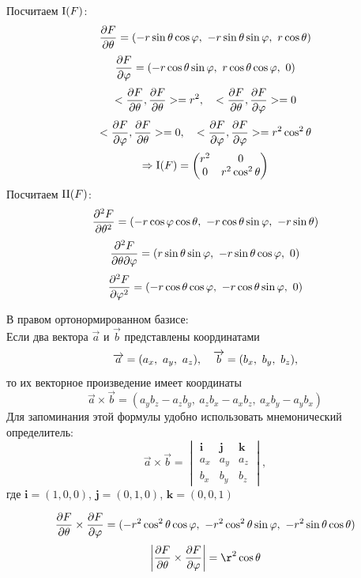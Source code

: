 \documentclass[main]{subfiles}
\begin{document}
    \begin{sol}
      Посчитаем $\RNumb{1}(F)$:
      \[\frac{\partial F}{\partial \theta} = (-r \sin\theta \cos\varphi,\ -r \sin\theta \sin\varphi,\ r \cos\theta)\]
      \[\frac{\partial F}{\partial \varphi} = (-r \cos\theta \sin\varphi,\ r \cos\theta \cos\varphi,\ 0)\]
      \[<\frac{\partial F}{\partial \theta}, \frac{\partial F}{\partial \theta}> = r^2,\quad
      <\frac{\partial F}{\partial \theta}, \frac{\partial F}{\partial \varphi}> = 0\]
      \[<\frac{\partial F}{\partial \varphi}, \frac{\partial F}{\partial \theta}> = 0,\quad
      <\frac{\partial F}{\partial \varphi}, \frac{\partial F}{\partial \varphi}> = r^2 \cos^2 \theta\]
      \[\Ra \RNumb{1}(F) =
      \begin{pmatrix}
        r^2 & 0\\
        0 & r^2 \cos^2 \theta
      \end{pmatrix}\]
      Посчитаем $\RNumb{2}(F)$:
      \[\frac{\partial^2 F}{\partial \theta^2} = (-r \cos \varphi \cos\theta,\ -r \cos\theta \sin\varphi,\ -r \sin\theta)\]
      \[\frac{\partial^2 F}{\partial \theta \partial\varphi} = (r \sin \theta \sin\varphi,\ -r \sin\theta \cos\varphi,\ 0)\]
      \[\frac{\partial^2 F}{\partial \varphi^2} = (-r \cos \theta \cos\varphi,\ -r \cos\theta \sin\varphi,\ 0)\]
      \begin{Reminder}
        В правом ортонормированном базисе:\\
        Если два вектора $\vec{a}$ и $\vec{b}$ представлены координатами
        \[\vec{a} = (a_x,\ a_y,\ a_z),\q \vec{b} = (b_x,\ b_y,\ b_z),\]
        то их векторное произведение имеет координаты
        \[\vec{a} \times \vec{b} = (a_y b_z - a_z b_y,\ a_z b_x - a_x b_z,\ a_x b_y - a_y b_x)\]
        Для запоминания этой формулы удобно использовать мнемонический определитель:
        \[\vec{a} \times \vec{b} =
        \begin{vmatrix}
          \mathbf i & \mathbf j & \mathbf k \\
          a_x & a_y & a_z \\
          b_x & b_y & b_z
        \end{vmatrix},\]
        где $\mathbf i = (1, 0, 0)$, $\mathbf j = (0, 1, 0)$, $\mathbf k = (0, 0, 1)$
      \end{Reminder}
      \[\frac{\partial F}{\partial \theta} \times \frac{\partial F}{\partial \varphi} =
      (
        -r^2 \cos^2 \theta \cos\varphi,\
        -r^2 \cos^2 \theta \sin\varphi,\
        -r^2 \sin\theta \cos\theta
      )\]
      \[\abs{ \frac{\d F}{\d \theta} \times \frac{\d F}{\d \varphi} } = \r^2 \cos\theta\]


\end{sol}
\end{document}
